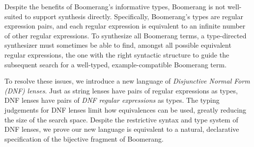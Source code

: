 \documentclass[sigplan,acmsmall]{acmart}
\begin{document}
Despite the benefits of Boomerang's informative types,
Boomerang is not well-suited to support synthesis directly.
Specifically, Boomerang's types are regular expression
pairs, and each regular expression is equivalent to an infinite
number of other regular expressions.
To synthesize all Boomerang terms, a type-directed synthesizer
must sometimes be able to find, amongst all possible equivalent
regular expressions, the one with the right
syntactic structure to guide the subsequent search for a 
well-typed, example-compatible Boomerang term.  


To resolve these issues, we introduce a new language of
\emph{Disjunctive Normal Form (DNF) lenses}.
Just as string lenses have pairs of regular expressions as types, DNF lenses
have pairs of \emph{DNF regular expressions} as types.
The typing judgements for DNF lenses limit how equivalences can be
used, 
greatly reducing the size
of the search space.
Despite the restrictive syntax and type system of DNF lenses, we prove our
new language is
equivalent to a natural, declarative specification of the 
bijective fragment of Boomerang.
\end{document}
